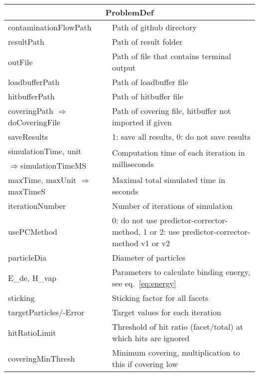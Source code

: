 \begin{center}
\begin{tabular}{|l|l|}
\hline
\multicolumn{2}{|c|}{\rule{0pt}{3ex}ProblemDef}\\
\hline
\rule{0pt}{3ex} contaminationFlowPath& Path of github directory\\
\rule{0pt}{3ex} resultPath& Path of result folder\\
\rule{0pt}{3ex} outFile& Path of file that contains terminal output\\
\rule{0pt}{3ex} loadbufferPath& Path of loadbuffer file\\
\rule{0pt}{3ex} hitbufferPath& Path of hitbuffer file\\
\rule{0pt}{3ex} coveringPath \scriptsize$\Rightarrow$doCoveringFile& Path of covering file, hitbuffer not imported if given\\
\rule{0pt}{3ex} saveResults& 1: save all results, 0: do not save results\\
\rule{0pt}{3ex} simulationTime, unit& \multirow{2}{*}{Computation time of each iteration in milliseconds}\\
\scriptsize\enskip$\Rightarrow$simulationTimeMS&\\
\rule{0pt}{3ex} maxTime, maxUnit \scriptsize$\Rightarrow$maxTimeS& Maximal total simulated time in seconds
\\
\rule{0pt}{3ex} iterationNumber& Number of iterations of simulation\\
\rule{0pt}{3ex} usePCMethod& 0: do not use predictor-corrector-method, 1 or 2: use predictor-corrector-method v1 or v2\\
\rule{0pt}{3ex} particleDia& Diameter of particles\\
\rule{0pt}{3ex}  E\_de, H\_vap& Parameters to calculate binding energy, see eq.\ \ref{eq:energy}\\ %
\rule{0pt}{3ex}  sticking&  Sticking factor for all facets\\
\rule{0pt}{3ex}  targetParticles/-Error&  Target values for each iteration\\
\rule{0pt}{3ex}  hitRatioLimit&  Threshold of hit ratio (facet/total) at which hits are ignored\\
\rule{0pt}{3ex}  coveringMinThresh&  Minimum covering, multiplication to this if covering low\\

\end{tabular}
\end{center}
